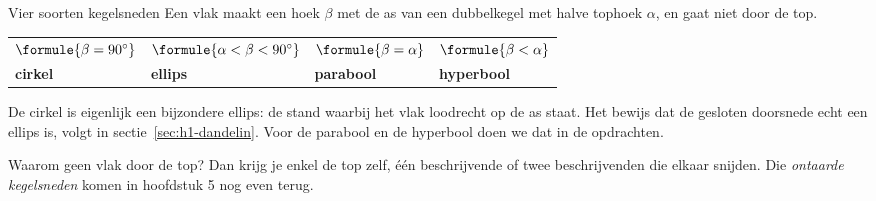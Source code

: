 \begin{theorie}
\begin{stelling}{Vier soorten kegelsneden}
Een vlak maakt een hoek $\beta$ met de as van een dubbelkegel met halve tophoek $\alpha$, en gaat niet door de top.

{\centering{}\renewcommand{\arraystretch}{1.4}%
\begin{tabular}{|>{\centering\arraybackslash}m{3cm}|>{\centering\arraybackslash}m{3cm}|>{\centering\arraybackslash}m{3cm}|>{\centering\arraybackslash}m{3cm}|}
\hline
$\formule{\beta = 90^\circ}$ & $\formule{\alpha < \beta < 90^\circ}$ & $\formule{\beta = \alpha}$ & $\formule{\beta < \alpha}$ \\
\textbf{\textcolor{accent}{cirkel}} & \textbf{\textcolor{accent}{ellips}} & \textbf{\textcolor{accent}{parabool}} & \textbf{\textcolor{accent}{hyperbool}} \\ \hline
\end{tabular}\par}
\end{stelling}
\end{theorie}


De cirkel is eigenlijk een bijzondere ellips: de stand waarbij het vlak loodrecht op de as staat. Het bewijs dat de gesloten doorsnede echt een ellips is, volgt in sectie~\ref{sec:h1-dandelin}. Voor de parabool en de hyperbool doen we dat in de opdrachten.

Waarom geen vlak door de top? Dan krijg je enkel de top zelf, één beschrijvende of twee beschrijvenden die elkaar snijden. Die \emph{ontaarde kegelsneden} komen in hoofdstuk 5 nog even terug.

